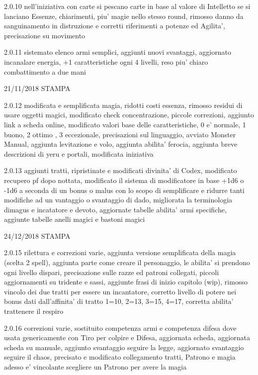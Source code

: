 \documentclass[a4paper,11pt,twoside,openany]{book}
\begin{document}
{{			2.0.10 nell'iniziativa con carte si pescano carte in base al valore di Intelletto se si lanciano Essenze, chiarimenti, piu' magie nello stesso round, rimosso danno da sanguinamento in distruzione e corretti riferimenti a potenze ed Agilita', precisazione su movimento
			
			2.0.11 sistemato elenco armi semplici, aggiunti nuovi svantaggi, aggiornato incanalare energia, +1 caratteristiche ogni 4 livelli, reso piu' chiaro combattimento a due mani
			
			21/11/2018 STAMPA
			
			2.0.12 modificata e semplificata magia, ridotti costi essenza, rimosso residui di usare oggetti magici, modificato check concentrazione, piccole correzioni, aggiunto link a scheda online, modificato valori base delle caratteristiche, 0 e' normale, 1 buono, 2 ottimo , 3 eccezionale, precisazioni sul linguaggio, avviato Monster Manual, aggiunta levitazione e volo, aggiunta abilita' ferocia, aggiunta breve descrizioni di yeru e portali, modificata iniziativa
			
			2.0.13 aggiunti tratti, ripristinate e modificati divinita' di Codex, modificato recupero pf dopo nottata, modificato il sistema di modificatore in base +1d6 o -1d6 a seconda di un bonus o malus con lo scopo di semplificare e ridurre tanti modifiche ad un vantaggio o svantaggio di dado, migliorata la terminologia dimagus e incatatore e devoto, aggiornate tabelle abilita' armi specifiche, aggiunte tabelle anelli magici e bastoni magici
			
			24/12/2018 STAMPA
			
			2.0.15 rilettura e correzioni varie, aggiunta versione semplificata della magia (scelta 2 spell), aggiunta parte come creare il personaggio, le abilita' si prendono ogni livello dispari, precisazione sulle razze ed patroni collegati, piccoli aggiornamenti su tridente e sassi, aggiunte frasi di inizio capitolo (wip), rimosso vincolo dei due tratti per essere un incantatore, corretto livello di potere nei bonus dati dall'affinita' di tratto 1=10, 2=13, 3=15, 4=17, corretta abilita' trattenere il respiro
			
			2.0.16 correzioni varie, sostituito competenza armi e competenza difesa dove usata genericamente con Tiro per colpire e Difesa, aggiornata scheda, aggiornata scheda su manuale, aggiunto svantaggio seguire la legge, aggiornato svantaggio seguire il chaos, precisato e modificato collegamento tratti, Patrono e magia adesso e' vincolante scegliere un Patrono per avere la magia
			
}}
\end{document}
